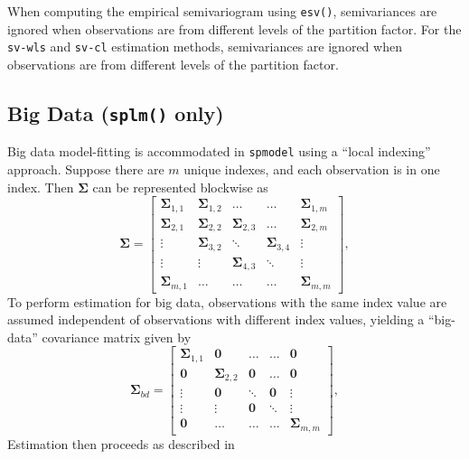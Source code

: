 \documentclass{article}
\begin{document}
When computing the empirical semivariogram using \texttt{esv()},
semivariances are ignored when observations are from different levels of
the partition factor. For the \texttt{sv-wls} and \texttt{sv-cl}
estimation methods, semivariances are ignored when observations are from
different levels of the partition factor.

\hypertarget{subsec:bigdata}{%
\subsection{\texorpdfstring{Big Data (\texttt{splm()}
only)}{Big Data (splm() only)}}\label{subsec:bigdata}}

Big data model-fitting is accommodated in \texttt{spmodel} using a
``local indexing'' approach. Suppose there are \(m\) unique indexes, and
each observation is in one index. Then \(\boldsymbol{\Sigma}\) can be
represented blockwise as \begin{equation}\label{eq:full_cov}
  \boldsymbol{\Sigma} = 
  \begin{bmatrix}
  \boldsymbol{\Sigma}_{1,1} & \boldsymbol{\Sigma}_{1,2} & \hdots & \hdots & \boldsymbol{\Sigma}_{1,m} \\
  \boldsymbol{\Sigma}_{2,1} & \boldsymbol{\Sigma}_{2,2} & \boldsymbol{\Sigma}_{2,3} & \hdots & \boldsymbol{\Sigma}_{2,m} \\
  \vdots & \boldsymbol{\Sigma}_{3,2} & \ddots & \boldsymbol{\Sigma}_{3,4} & \vdots \\
  \vdots & \vdots & \boldsymbol{\Sigma}_{4,3} & \ddots & \vdots \\
  \boldsymbol{\Sigma}_{m,1} & \hdots & \hdots & \hdots & \boldsymbol{\Sigma}_{m, m}
  \end{bmatrix},
\end{equation} To perform estimation for big data, observations with the
same index value are assumed independent of observations with different
index values, yielding a ``big-data'' covariance matrix given by
\begin{equation}\label{eq:bd_cov}
  \boldsymbol{\Sigma}_{bd} = 
  \begin{bmatrix}
  \boldsymbol{\Sigma}_{1,1} & \boldsymbol{0} & \hdots & \hdots & \boldsymbol{0} \\
  \boldsymbol{0} & \boldsymbol{\Sigma}_{2,2} & \boldsymbol{0} & \hdots & \boldsymbol{0} \\
  \vdots & \boldsymbol{0} & \ddots & \boldsymbol{0} & \vdots \\
  \vdots & \vdots & \boldsymbol{0} & \ddots & \vdots \\
  \boldsymbol{0} & \hdots & \hdots & \hdots & \boldsymbol{\Sigma}_{m, m}
  \end{bmatrix},
\end{equation} Estimation then proceeds as described in
\end{document}
